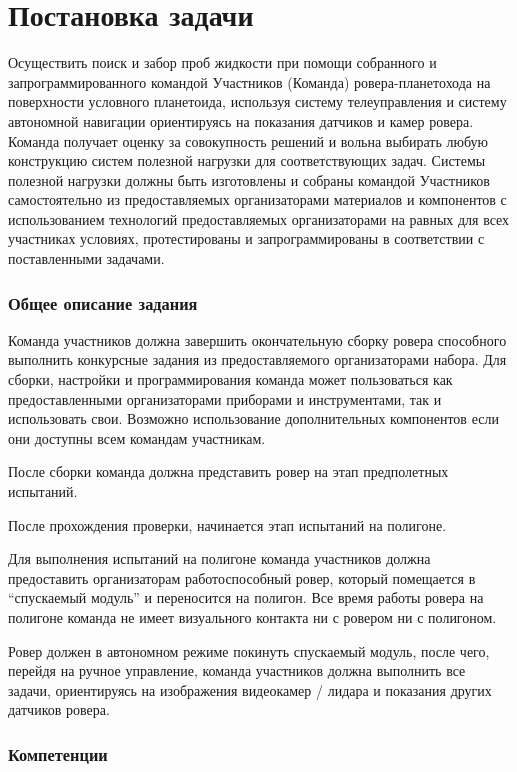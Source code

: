 \section{Постановка задачи}

Осуществить поиск и забор проб жидкости при помощи собранного и запрограммированного командой Участников (Команда) ровера-планетохода на поверхности условного планетоида, используя систему телеуправления и систему автономной навигации ориентируясь на показания датчиков и камер ровера.
Команда получает оценку за совокупность решений и вольна выбирать любую конструкцию систем полезной нагрузки для соответствующих задач. Системы полезной нагрузки должны быть изготовлены и собраны командой Участников самостоятельно из предоставляемых организаторами материалов и компонентов с использованием технологий предоставляемых организаторами на равных для всех участниках условиях, протестированы и запрограммированы в соответствии с поставленными задачами.

\subsubsection*{Общее описание задания}

Команда участников должна завершить окончательную сборку ровера способного выполнить конкурсные задания из предоставляемого организаторами набора. Для сборки, настройки и программирования команда может пользоваться как предоставленными организаторами приборами и инструментами, так и использовать свои. Возможно использование дополнительных компонентов если они доступны всем командам участникам.

После сборки команда должна представить ровер на этап предполетных испытаний. 

После прохождения проверки, начинается этап испытаний на полигоне. 

Для выполнения испытаний на полигоне команда участников должна предоставить организаторам работоспособный ровер, который помещается в “спускаемый модуль” и переносится на полигон.  Все время работы ровера на полигоне команда не имеет визуального контакта ни с ровером ни с полигоном.

Ровер должен в автономном режиме покинуть спускаемый модуль, после чего, перейдя на ручное управление, команда участников должна выполнить все задачи, ориентируясь на изображения видеокамер / лидара и показания других датчиков ровера. 

\subsubsection*{Компетенции}

